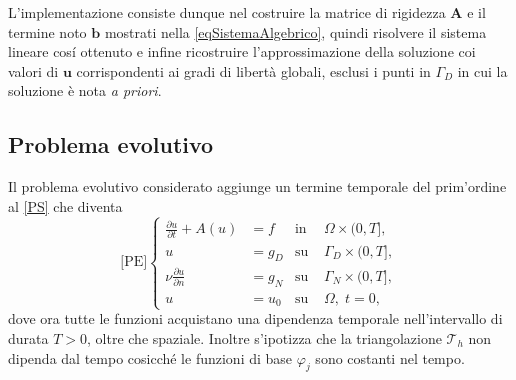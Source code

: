 \documentclass{article}
\newcommand{\derP}[2]{\frac{\partial#1}{\partial#2}}
\newcommand{\teqref}[2]{\hyperref[#1]{#2}}
\begin{document}
            L'implementazione consiste dunque nel costruire la matrice di rigidezza $\mathbf A$ e il termine noto $\mathbf b$ mostrati nella \eqref{eqSistemaAlgebrico}, quindi risolvere il sistema lineare cosí ottenuto e infine ricostruire l'approssimazione della soluzione coi valori di $\mathbf u$ corrispondenti ai gradi di libertà globali, esclusi i punti in $\Gamma_D$ in cui la soluzione è nota \textit{a priori}.

        
        \subsection{Problema evolutivo} \label{ParProblemaEvolutivo}

            Il problema evolutivo considerato aggiunge un termine temporale del prim'ordine al \teqref{eqProblemaStazionario}{[PS]} che diventa
            \begin{equation}
                \text{[PE]}
                \left\{
                \begin{aligned}
                    \derP ut+A(u)
                               &=f                &\text{in }&\Omega\times(0,T],\\
                    u          &=g_D              &\text{su }&\Gamma_D\times(0,T],\\
                    \nu\derP un&=g_N              &\text{su }&\Gamma_N\times(0,T],\\
                    u&=u_0              &\text{su }&\Omega,\;t=0,
                \end{aligned}
                \right.
                \label{eqProblemaEllitticoEvolutivo}
            \end{equation}
            dove ora tutte le funzioni acquistano una dipendenza temporale nell'intervallo di durata $T>0$, oltre che spaziale. Inoltre s'ipotizza che la triangolazione $\mathcal T_h$ non dipenda dal tempo cosicché le funzioni di base $\varphi_j$ sono costanti nel tempo.
\end{document}
